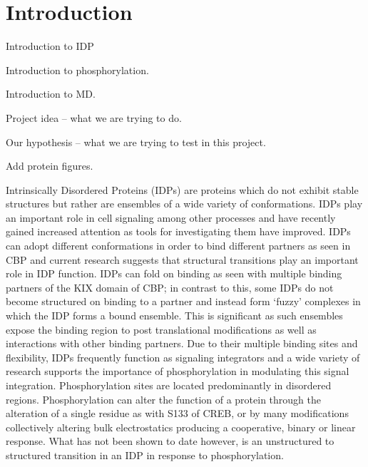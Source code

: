 \section{Introduction} %
\label{sec:introduction}

Introduction to IDP

Introduction to phosphorylation.

Introduction to MD.

Project idea -- what we are trying to do.

Our hypothesis -- what we are trying to test in this project.

Add protein figures.


Intrinsically Disordered Proteins (IDPs) are proteins which do not exhibit stable structures but rather are ensembles of a wide variety of conformations.
IDPs play an important role in cell signaling among other processes and have recently gained increased attention as tools for investigating them have improved.
IDPs can adopt different conformations in order to bind different partners as seen in CBP and current research suggests that structural transitions play an important role in IDP function.
IDPs can fold on binding as seen with multiple binding partners of the KIX domain of CBP; in contrast to this, some IDPs do not become structured on binding to a partner and instead form ‘fuzzy’ complexes in which the IDP forms a bound ensemble.
This is significant as such ensembles expose the binding region to post translational modifications as well as interactions with other binding partners.
Due to their multiple binding sites and flexibility, IDPs frequently function as signaling integrators and a wide variety of research supports the importance of phosphorylation in modulating this signal integration.
Phosphorylation sites are located predominantly in disordered regions.
Phosphorylation can alter the function of a protein through the alteration of a single residue as with S133 of CREB, or by many modifications collectively altering bulk electrostatics producing a cooperative, binary or linear response.
What has not been shown to date however, is an unstructured to structured transition in an IDP in response to phosphorylation.


